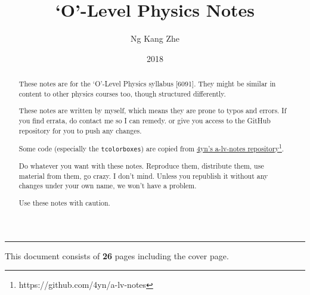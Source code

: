\documentclass[a4paper,10pt]{article}
\title{`O'-Level Physics Notes}
\author{Ng Kang Zhe}
\date{2018}
\begin{document}
\maketitle

\begin{abstract}
	These notes are for the `O'-Level Physics syllabus [6091]. They might be similar in content to other physics courses too, though structured differently.
	
	These notes are written by myself, which means they are prone to typos and errors. If you find errata, do contact me so I can remedy. or give you access to the GitHub repository for you to push any changes.
	
	Some code (especially the \texttt{tcolorboxes}) are copied from \href{https://github.com/4yn/a-lv-notes}{\color{blue} \underline{4yn's a-lv-notes repository\footnote{https://github.com/4yn/a-lv-notes}}}.
	
	Do whatever you want with these notes. Reproduce them, distribute them, use material from them, go crazy. I don't mind. Unless you republish it without any changes under your own name, we won't have a problem.
	
	Use these notes with caution.
\end{abstract}

\begin{multicols}{2}
\tableofcontents
\end{multicols}

\vspace*{\fill}
\hrule
\begin{center}
	This document consists of \textbf{26} pages including the cover page.
\end{center}
\end{document}
